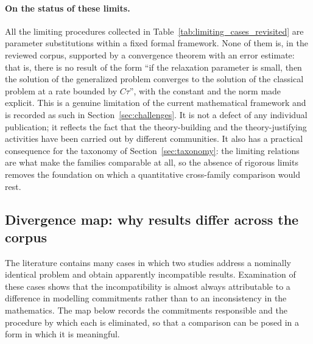 \paragraph{On the status of these limits.}
All the limiting procedures collected in Table~\ref{tab:limiting_cases_revisited} are parameter substitutions within a fixed formal framework. None of them is, in the reviewed corpus, supported by a convergence theorem with an error estimate: that is, there is no result of the form ``if the relaxation parameter is small, then the solution of the generalized problem converges to the solution of the classical problem at a rate bounded by $C\tau$'', with the constant and the norm made explicit. This is a genuine limitation of the current mathematical framework and is recorded as such in Section~\ref{sec:challenges}. It is not a defect of any individual publication; it reflects the fact that the theory-building and the theory-justifying activities have been carried out by different communities. It also has a practical consequence for the taxonomy of Section~\ref{sec:taxonomy}: the limiting relations are what make the families comparable at all, so the absence of rigorous limits removes the foundation on which a quantitative cross-family comparison would rest.

\subsection{Divergence map: why results differ across the corpus}
\label{sec:12.4}

The literature contains many cases in which two studies address a nominally identical problem and obtain apparently incompatible results. Examination of these cases shows that the incompatibility is almost always attributable to a difference in modelling commitments rather than to an inconsistency in the mathematics. The map below records the commitments responsible and the procedure by which each is eliminated, so that a comparison can be posed in a form in which it is meaningful.

